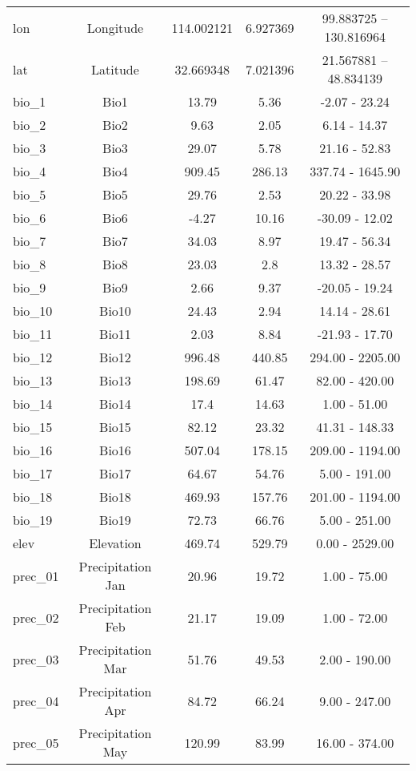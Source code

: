 \documentclass[AutoFakeBold]{LZUThesis-PgD&PhD}
\begin{document}
\begin{longtable}[H]{lcccc}
	   lon & Longitude & 114.002121 & 6.927369 & 99.883725 -- 130.816964 \\
	   lat & Latitude & 32.669348 & 7.021396 & 21.567881 -- 48.834139 \\
	   bio\_1 & Bio1 & 13.79 & 5.36 & -2.07 - 23.24 \\
	   bio\_2 & Bio2 & 9.63 & 2.05 & 6.14 - 14.37 \\
	   bio\_3 & Bio3 & 29.07 & 5.78 & 21.16 - 52.83 \\
	   bio\_4 & Bio4 & 909.45 & 286.13 & 337.74 - 1645.90 \\
	   bio\_5 & Bio5 & 29.76 & 2.53 & 20.22 - 33.98 \\
	   bio\_6 & Bio6 & -4.27 & 10.16 & -30.09 - 12.02 \\
	   bio\_7 & Bio7 & 34.03 & 8.97 & 19.47 - 56.34 \\
	   bio\_8 & Bio8 & 23.03 & 2.8 & 13.32 - 28.57 \\
	   bio\_9 & Bio9 & 2.66 & 9.37 & -20.05 - 19.24 \\
	   bio\_10 & Bio10 & 24.43 & 2.94 & 14.14 - 28.61 \\
	   bio\_11 & Bio11 & 2.03 & 8.84 & -21.93 - 17.70 \\
	   bio\_12 & Bio12 & 996.48 & 440.85 & 294.00 - 2205.00 \\
	   bio\_13 & Bio13 & 198.69 & 61.47 & 82.00 - 420.00 \\
	   bio\_14 & Bio14 & 17.4 & 14.63 & 1.00 - 51.00 \\
	   bio\_15 & Bio15 & 82.12 & 23.32 & 41.31 - 148.33 \\
	   bio\_16 & Bio16 & 507.04 & 178.15 & 209.00 - 1194.00 \\
	   bio\_17 & Bio17 & 64.67 & 54.76 & 5.00 - 191.00 \\
	   bio\_18 & Bio18 & 469.93 & 157.76 & 201.00 - 1194.00 \\
	   bio\_19 & Bio19 & 72.73 & 66.76 & 5.00 - 251.00 \\
	   elev & Elevation & 469.74 & 529.79 & 0.00 - 2529.00 \\
	   prec\_01 & Precipitation Jan & 20.96 & 19.72 & 1.00 - 75.00 \\
	   prec\_02 & Precipitation Feb & 21.17 & 19.09 & 1.00 - 72.00 \\
	   prec\_03 & Precipitation Mar & 51.76 & 49.53 & 2.00 - 190.00 \\
	   prec\_04 & Precipitation Apr & 84.72 & 66.24 & 9.00 - 247.00 \\
	   prec\_05 & Precipitation May & 120.99 & 83.99 & 16.00 - 374.00 \\

\end{longtable}
\end{document}
